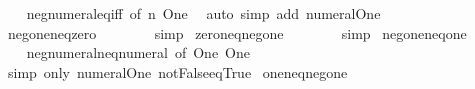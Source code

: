 \begin{isabellebody}
%
\isadelimproof
\ \ %
\endisadelimproof
%
\isatagproof
{}\isamarkupfalse%
\ neg{\isacharunderscore}{\kern0pt}numeral{\isacharunderscore}{\kern0pt}eq{\isacharunderscore}{\kern0pt}iff\ {\isacharbrackleft}{\kern0pt}of\ n\ One{\isacharbrackright}{\kern0pt}\ \isamarkupfalse%
\ {\isacharparenleft}{\kern0pt}auto\ simp\ add{\isacharcolon}{\kern0pt}\ numeral{\isacharunderscore}{\kern0pt}One{\isacharparenright}{\kern0pt}%
\endisatagproof
{\isafoldproof}%
%
\isadelimproof
\isanewline
%
\endisadelimproof
\isanewline
{}\isamarkupfalse%
\ neg{\isacharunderscore}{\kern0pt}one{\isacharunderscore}{\kern0pt}neq{\isacharunderscore}{\kern0pt}zero{\isacharcolon}{\kern0pt}\ {\isachardoublequoteopen}{\isacharminus}{\kern0pt}\ {}\ {\isasymnoteq}\ {}{\isachardoublequoteclose}\isanewline
%
\isadelimproof
\ \ %
\endisadelimproof
%
\isatagproof
{}\isamarkupfalse%
\ simp%
\endisatagproof
{\isafoldproof}%
%
\isadelimproof
\isanewline
%
\endisadelimproof
\isanewline
{}\isamarkupfalse%
\ zero{\isacharunderscore}{\kern0pt}neq{\isacharunderscore}{\kern0pt}neg{\isacharunderscore}{\kern0pt}one{\isacharcolon}{\kern0pt}\ {\isachardoublequoteopen}{}\ {\isasymnoteq}\ {\isacharminus}{\kern0pt}\ {}{\isachardoublequoteclose}\isanewline
%
\isadelimproof
\ \ %
\endisadelimproof
%
\isatagproof
{}\isamarkupfalse%
\ simp%
\endisatagproof
{\isafoldproof}%
%
\isadelimproof
\isanewline
%
\endisadelimproof
\isanewline
{}\isamarkupfalse%
\ neg{\isacharunderscore}{\kern0pt}one{\isacharunderscore}{\kern0pt}neq{\isacharunderscore}{\kern0pt}one{\isacharcolon}{\kern0pt}\ {\isachardoublequoteopen}{\isacharminus}{\kern0pt}\ {}\ {\isasymnoteq}\ {}{\isachardoublequoteclose}\isanewline
%
\isadelimproof
\ \ %
\endisadelimproof
%
\isatagproof
{}\isamarkupfalse%
\ neg{\isacharunderscore}{\kern0pt}numeral{\isacharunderscore}{\kern0pt}neq{\isacharunderscore}{\kern0pt}numeral\ {\isacharbrackleft}{\kern0pt}of\ One\ One{\isacharbrackright}{\kern0pt}\ \isamarkupfalse%
\ {\isacharparenleft}{\kern0pt}simp\ only{\isacharcolon}{\kern0pt}\ numeral{\isacharunderscore}{\kern0pt}One\ not{\isacharunderscore}{\kern0pt}False{\isacharunderscore}{\kern0pt}eq{\isacharunderscore}{\kern0pt}True{\isacharparenright}{\kern0pt}%
\endisatagproof
{\isafoldproof}%
%
\isadelimproof
\isanewline
%
\endisadelimproof
\isanewline
{}\isamarkupfalse%
\ one{\isacharunderscore}{\kern0pt}neq{\isacharunderscore}{\kern0pt}neg{\isacharunderscore}{\kern0pt}one{\isacharcolon}{\kern0pt}\ {\isachardoublequoteopen}{}\ {\isasymnoteq}\ {\isacharminus}{\kern0pt}\ {}{\isachardoublequoteclose}\isanewline

\end{isabellebody}
